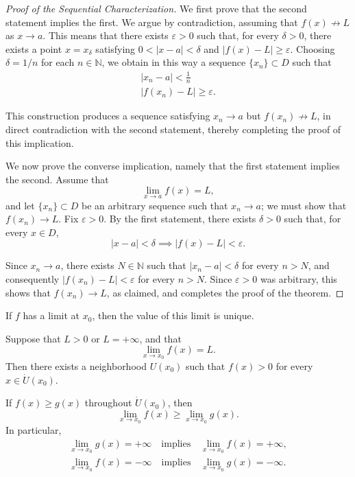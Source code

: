 \begin{proof}[Proof of the Sequential Characterization]
We first prove that the second statement implies the first. We argue by contradiction, assuming that $f(x) \not\to L$ as $x \to a$. This means that there exists $\varepsilon > 0$ such that, for every $\delta > 0$, there exists a point $x = x_\delta$ satisfying $0 < |x - a| < \delta$ and $|f(x) - L| \geq \varepsilon$. Choosing $\delta = 1/n$ for each $n \in \mathbb{N}$, we obtain in this way a sequence $\{x_n\} \subset D$ such that
\[
\begin{gathered}
|x_n - a| < \frac{1}{n} \\
|f(x_n) - L| \geq \varepsilon.
\end{gathered}
\]

This construction produces a sequence satisfying $x_n \to a$ but $f(x_n) \not\to L$, in direct contradiction with the second statement, thereby completing the proof of this implication.

We now prove the converse implication, namely that the first statement implies the second. Assume that \[
\lim_{x \to a} f(x) = L,
\] and let $\{x_n\} \subset D$ be an arbitrary sequence such that $x_n \to a$; we must show that $f(x_n) \to L$. Fix $\varepsilon > 0$. By the first statement, there exists $\delta > 0$ such that, for every $x \in D$,
\[
|x - a| < \delta \implies |f(x) - L| < \varepsilon.
\]

Since $x_n \to a$, there exists $N \in \mathbb{N}$ such that $|x_n - a| < \delta$ for every $n > N$, and consequently $|f(x_n) - L| < \varepsilon$ for every $n > N$. Since $\varepsilon > 0$ was arbitrary, this shows that $f(x_n) \to L$, as claimed, and completes the proof of the theorem.
\end{proof}

\begin{theorem}[Uniqueness]
If $f$ has a limit at $x_0$, then the value of this limit is unique.
\end{theorem}

\begin{theorem}
Suppose that $L > 0$ or $L = +\infty$, and that
\[
\lim_{x \to x_0} f(x) = L.
\]
Then there exists a neighborhood $U(x_0)$ such that $f(x) > 0$ for every $x \in \dot{U}(x_0)$.
\end{theorem}

\begin{theorem}
If $f(x) \geq g(x)$ throughout $\dot{U}(x_0)$, then
\[
\lim_{x \to x_0} f(x) \geq \lim_{x \to x_0} g(x).
\]
In particular,
\[
\begin{gathered}
\lim_{x \to x_0} g(x) = +\infty\quad\text{implies}\quad \lim_{x \to x_0} f(x) = +\infty, \\
\lim_{x \to x_0} f(x) = -\infty\quad\text{implies}\quad \lim_{x \to x_0} g(x) = -\infty.
\end{gathered}
\]

\end{theorem}

